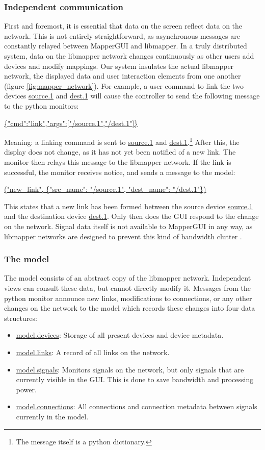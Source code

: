 		\subsubsection{Independent communication}

First and foremost, it is essential that data on the screen reflect data on the network. This is not entirely straightforward, as asynchronous messages are constantly relayed between MapperGUI and libmapper. In a truly distributed system, data on the libmapper network changes continuously as other users add devices and modify mappings. Our system insulates the actual libmapper network, the displayed data and user interaction elements from one another (figure \ref{fig:mapper_network}). For example, a user command to link the two devices \url{source.1} and \url{dest.1} will cause the controller to send the following message to the python monitors:

\url{ {"cmd":"link","args":["/source.1","/dest.1"]} }

Meaning: a linking command is sent to \url{source.1} and \url{dest.1}.\footnote{The message itself is a python dictionary.} After this, the display does not change, as it has not yet been notified of a new link. The monitor then relays this message to the libmapper network. If the link is successful, the monitor receives notice, and sends a message to the model:

\url{("new_link", {"src_name": "/source.1", "dest_name": "/dest.1"}) }

This states that a new link has been formed between the source device \url{source.1} and the destination device \url{dest.1}. Only then does the GUI respond to the change on the network. Signal data itself is not available to MapperGUI in any way, as libmapper networks are designed to prevent this kind of bandwidth clutter .

		\subsubsection{The model}

The model consists of an abstract copy of the libmapper network. Independent views can consult these data, but cannot directly modify it. Messages from the python monitor announce new links, modifications to connections, or any other changes on the network to the model which records these changes into four data structures:

\begin{itemize}
 	\item \url{model.devices}: Storage of all present devices and device metadata.
 	\item \url{model.links}: A record of all links on the network.
 	\item \url{model.signals}: Monitors signals on the network, but only signals that are currently visible in the GUI. This is done to save bandwidth and processing power. 
 	\item \url{model.connections}: All connections and connection metadata between signals currently in the model.
 \end{itemize} 

